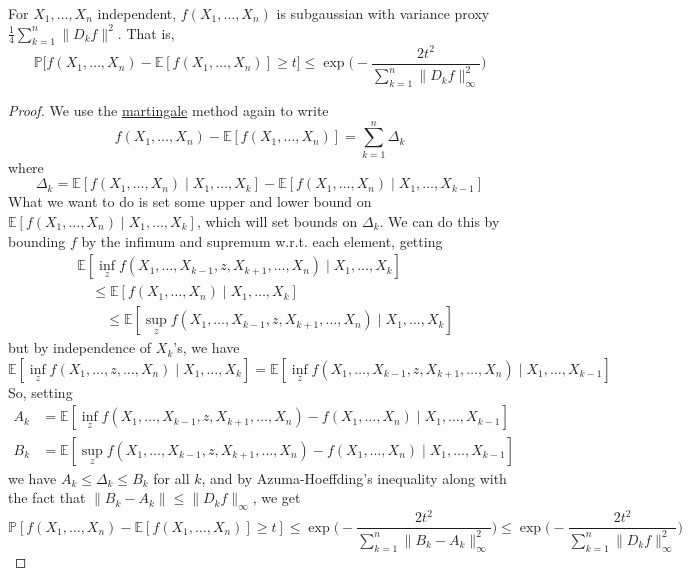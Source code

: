   \begin{theorem}[McDiarmid]
    \label{thm:mcdiarmid}
  For $X_1, \ldots, X_n$ independent, $f(X_1, \ldots, X_n)$ is subgaussian with variance proxy $\frac{1}{4} \sum_{k=1}^n \|D_k f\|^2$. That is, 
  \begin{equation}
    \mathbb{P}\big[ f(X_1, \ldots, X_n) - \mathbb{E}[f(X_1, \ldots, X_n)] \geq t \big] \leq \exp \bigg( -\frac{2 t^2}{\sum_{k=1}^n \|D_k f\|^2_\infty} \bigg)
  \end{equation}
  \end{theorem}
  \begin{proof}
  We use the \hyperref[sp-def:martingale]{martingale} method again to write 
  \begin{equation}
    f(X_1, \ldots, X_n) - \mathbb{E}[f(X_1, \ldots, X_n)] = \sum_{k=1}^n \Delta_k
  \end{equation}
  where 
  \begin{equation}
    \Delta_k = \mathbb{E}[f(X_1, \ldots, X_n) \mid X_1, \ldots, X_k] - \mathbb{E}[f(X_1, \ldots, X_n) \mid X_1, \ldots, X_{k-1}]
  \end{equation}
  What we want to do is set some upper and lower bound on $\mathbb{E}[f(X_1, \ldots, X_n) \mid X_1, \ldots, X_k]$, which will set bounds on $\Delta_k$. We can do this by bounding $f$ by the infimum and supremum w.r.t. each element, getting 
  \begin{align*}
      &\mathbb{E}[ \inf_z f(X_1, \ldots, X_{k-1}, z, X_{k+1}, \ldots, X_n) \mid X_1, \ldots, X_k] \\
      &\quad\leq \mathbb{E}[f (X_1, \ldots, X_n) \mid X_1, \ldots, X_k] \\
      &\qquad \leq \mathbb{E}[ \sup_z f(X_1, \ldots, X_{k-1}, z, X_{k+1}, \ldots, X_n) \mid X_1, \ldots, X_k]
  \end{align*}
  but by independence of $X_k$'s, we have 
  \begin{equation}
    \mathbb{E}[ \inf_z f(X_1, \ldots, z, \ldots, X_n) \mid X_1, \ldots, X_k] = \mathbb{E}[ \inf_z f(X_1, \ldots, X_{k-1}, z, X_{k+1}, \ldots, X_n) \mid X_1, \ldots, X_{k-1}]
  \end{equation}
  So, setting 
  \begin{align*}
      A_k & = \mathbb{E}[ \inf_z f(X_1, \ldots, X_{k-1}, z, X_{k+1}, \ldots, X_n) - f(X_1, \ldots, X_n) \mid X_1, \ldots, X_{k-1}] \\
      B_k & = \mathbb{E}[ \sup_z f(X_1, \ldots, X_{k-1}, z, X_{k+1}, \ldots, X_n) - f(X_1, \ldots, X_n) \mid X_1, \ldots, X_{k-1}]
  \end{align*}
  we have $A_k \leq \Delta_k \leq B_k$ for all $k$, and by Azuma-Hoeffding's inequality along with the fact that $\|B_k - A_k\| \leq \|D_k f\|_\infty$, we get 
  \begin{equation}
    \mathbb{P}[ f(X_1, \ldots, X_n) - \mathbb{E}[ f(X_1, \ldots, X_n)] \geq t] \leq \exp \bigg(- \frac{2t^2}{\sum_{k=1}^n \|B_k - A_k\|^2_\infty} \bigg) \leq \exp \bigg(- \frac{2t^2}{\sum_{k=1}^n \|D_k f\|^2_\infty} \bigg)
  \end{equation}
  \end{proof}

